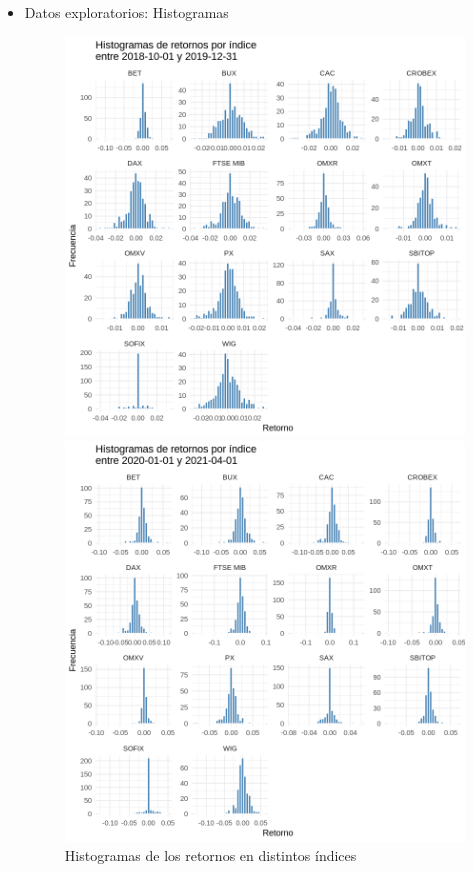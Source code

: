 \documentclass[12pt]{article}
\begin{document}
\begin{itemize}
\item Datos exploratorios: Histogramas
\begin{figure}[H]
    \centering
    \begin{minipage}{0.48\textwidth}
        \centering
        \includegraphics[width=\linewidth]{histograma.png}
    \end{minipage}
    \hfill
    \begin{minipage}{0.48\textwidth}
        \centering
        \includegraphics[width=\linewidth]{histograma2.png}
    \end{minipage}
    \caption{Histogramas de los retornos en distintos índices}
\end{figure}


\end{itemize}
\end{document}
